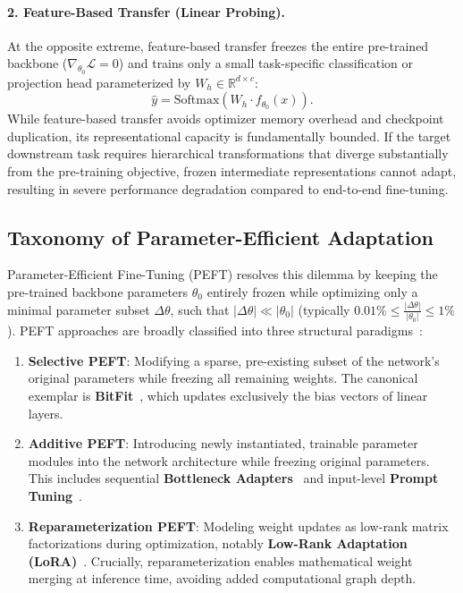 \documentclass[../../../main.tex]{subfiles}
\begin{document}
\paragraph{2. Feature-Based Transfer (Linear Probing).}
At the opposite extreme, feature-based transfer freezes the entire pre-trained backbone ($\nabla_{\theta_0} \mathcal{L} = 0$) and trains only a small task-specific classification or projection head parameterized by $W_h \in \mathbb{R}^{d \times c}$:
\begin{equation}
\label{eq:feature_based_head}
\hat{y} = \text{Softmax}(W_h \cdot f_{\theta_0}(x)).
\end{equation}
While feature-based transfer avoids optimizer memory overhead and checkpoint duplication, its representational capacity is fundamentally bounded. If the target downstream task requires hierarchical transformations that diverge substantially from the pre-training objective, frozen intermediate representations cannot adapt, resulting in severe performance degradation compared to end-to-end fine-tuning.

\subsection{Taxonomy of Parameter-Efficient Adaptation}
\label{subsec:peft_taxonomy}

Parameter-Efficient Fine-Tuning (PEFT) resolves this dilemma by keeping the pre-trained backbone parameters $\theta_0$ entirely frozen while optimizing only a minimal parameter subset $\Delta \theta$, such that $|\Delta \theta| \ll |\theta_0|$ (typically $0.01\% \le \frac{|\Delta \theta|}{|\theta_0|} \le 1\%$). PEFT approaches are broadly classified into three structural paradigms~\citep{lialin2023peft}:
\begin{enumerate}
    \item \textbf{Selective PEFT}: Modifying a sparse, pre-existing subset of the network's original parameters while freezing all remaining weights. The canonical exemplar is \textbf{BitFit}~\citep{zaken2021bitfit}, which updates exclusively the bias vectors of linear layers.
    \item \textbf{Additive PEFT}: Introducing newly instantiated, trainable parameter modules into the network architecture while freezing original parameters. This includes sequential \textbf{Bottleneck Adapters}~\citep{houlsby2019parameter, pfeiffer2020adapterhub} and input-level \textbf{Prompt Tuning}~\citep{lester2021power}.
    \item \textbf{Reparameterization PEFT}: Modeling weight updates as low-rank matrix factorizations during optimization, notably \textbf{Low-Rank Adaptation (LoRA)}~\citep{hu2021lora}. Crucially, reparameterization enables mathematical weight merging at inference time, avoiding added computational graph depth.
\end{enumerate}
\end{document}
